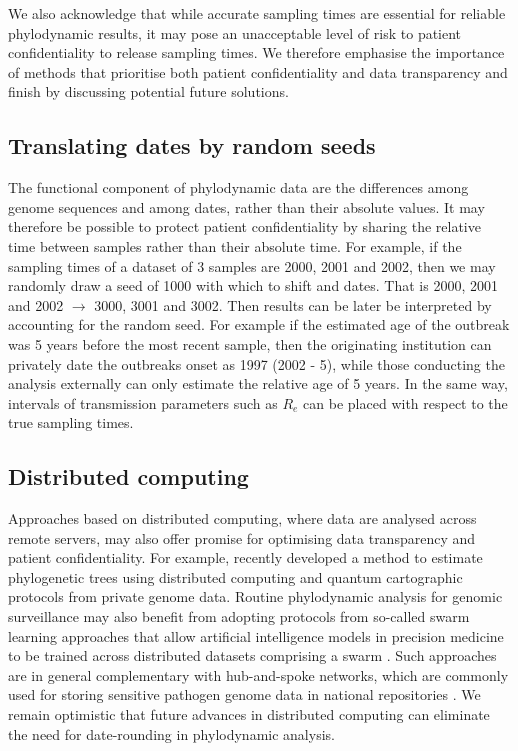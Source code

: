 \documentclass[12pt]{article}
\begin{document}
\begin{spacing}{2}
We also acknowledge that while accurate sampling times are essential for reliable phylodynamic results, it may pose an unacceptable level of risk to patient confidentiality to release sampling times. We therefore emphasise the importance of methods that prioritise both patient confidentiality and data transparency and finish by discussing potential future solutions.

\subsection*{Translating dates by random seeds}
The functional component of phylodynamic data are the differences among genome sequences and among dates, rather than their absolute values. It may therefore be possible to protect patient confidentiality by sharing the relative time between samples rather than their absolute time. For example, if the sampling times of a dataset of 3 samples are 2000, 2001 and 2002, then we may randomly draw a seed of 1000 with which to shift and dates. That is 2000, 2001 and 2002 $\rightarrow$ 3000, 3001 and 3002. Then results can be later be interpreted by accounting for the random seed. For example if the estimated age of the outbreak was 5 years before the most recent sample, then the originating institution can privately date the outbreaks onset as 1997 (2002 - 5), while those conducting the analysis externally can only estimate the relative age of 5 years. In the same way, intervals of transmission parameters such as $R_e$ can be placed with respect to the true sampling times.

\subsection*{Distributed computing}
Approaches based on distributed computing, where data are analysed across remote servers, may also offer promise for optimising data transparency and patient confidentiality. For example, \citet{santos_private_2022} recently developed a method to estimate phylogenetic trees using distributed computing and quantum cartographic protocols from private genome data. Routine phylodynamic analysis for genomic surveillance may also benefit from adopting protocols from so-called swarm learning approaches that allow artificial intelligence models in precision medicine to be trained across distributed datasets comprising a swarm \citep{warnat-herresthal_swarm_2021}. Such approaches are in general complementary with hub-and-spoke networks, which are commonly used for storing sensitive pathogen genome data in national repositories \citep{hoang_austrakka_2022}. We remain optimistic that future advances in distributed computing can eliminate the need for date-rounding in phylodynamic analysis.


\end{spacing}
\end{document}
